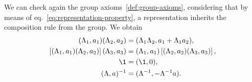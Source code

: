 We can check again the group axioms~\ref{def:group-axioms}, considering that by means of eq.~\eqref{eq:representation-property}, a representation inherits the composition rule from the group. We obtain
\begin{subequations}
\begin{align}
    (\Lambda_1, a_1) (\Lambda_2, a_2) &= (\Lambda_1 \Lambda_2, a_1 + \Lambda_1 a_2), \label{eq:poincare-group-multiplication} \\
    \left[(\Lambda_1,a_1)(\Lambda_2,a_2)\right] (\Lambda_3,a_3) &= (\Lambda_1, a_1) \left[ (\Lambda_2,a_2)(\Lambda_3,a_3) \right], \label{eq:poincare-associative} \\
    \1 &= (\1, 0) ,\label{eq:poincare-unit-element} \\
    (\Lambda, a)^{-1} &= (\Lambda^{-1}, -\Lambda^{-1}a). \label{eq:poincare-inverse-element}
\end{align}
\end{subequations}
